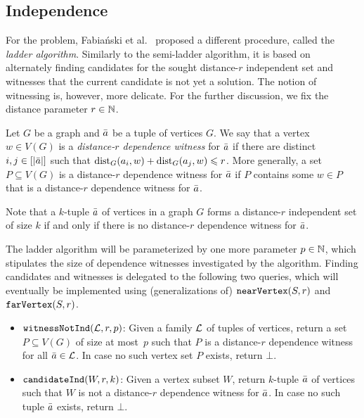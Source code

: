 \subsection{Independence}

For the  problem, Fabia\'nski et al.~\cite{FabianskiPST19,Fabianski2018arxiv} proposed a different procedure, called the \emph{ladder algorithm}. Similarly to the semi-ladder algorithm, it is based on alternately finding candidates for the sought distance-$r$ independent set and witnesses that the current candidate is not yet a solution. The notion of witnessing is, however, more delicate. For the further discussion, we fix the distance parameter $r\in \N$.

\begin{definition}
	Let $G$ be a graph  and $\tup a$ be a tuple of vertices $G$. We say that a vertex $w\in V(G)$ is a \emph{distance-$r$ dependence witness} for $\tup a$ if there are distinct $i,j\in [|\tup a|]$ such that $\dist_G(a_i,w)+\dist_G(a_j,w)\leq r$. More generally, a set $P\subseteq V(G)$ is a distance-$r$ dependence witness for $\tup a$ if $P$ contains some $w\in P$ that is a distance-$r$ dependence witness for $\tup a$.
\end{definition}

Note that a $k$-tuple $\tup a$ of vertices in a graph $G$ forms a distance-$r$ independent set of size $k$ if and only if there is no distance-$r$ dependence witness for $\tup a$.

The ladder algorithm will be parameterized by one more parameter $p\in \N$, which stipulates the size of dependence witnesses investigated by the algorithm. Finding candidates and witnesses is delegated to the following two queries, which will eventually be implemented using (generalizations of) $\near{S,r}$ and $\far{S,r}$.
\begin{itemize}
	\item $\witnessInd{\cal L,r,p}$:
	Given a family $\cal L$ of tuples of vertices, return a set $P\subseteq V(G)$ of size at most~$p$ such that $P$ is a distance-$r$ dependence witness for all $\tup a\in \cal L$. In case no such vertex set $P$ exists, return $\bot$.
	\item $\candidateInd{W,r,k}$: Given a vertex subset $W$, return $k$-tuple $\tup a$ of vertices such that $W$ is not a distance-$r$ dependence witness for $\tup a$. In case no such tuple $\tup a$ exists, return $\bot$.
\end{itemize}

